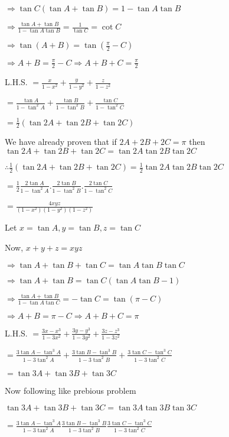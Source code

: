  $\Rightarrow \tan C(\tan A + \tan B) = 1 - \tan A\tan B$

  $\Rightarrow \frac{\tan A + \tan B}{1 - \tan A\tan B} = \frac{1}{\tan C} = \cot C$

  $\Rightarrow \tan(A + B) = \tan\left(\frac{\pi}{2} - C\right)$

  $\Rightarrow A + B = \frac{\pi}{2} - C \Rightarrow A + B + C = \frac{\pi}{2}$

  L.H.S. $= \frac{x}{1 - x^2} + \frac{y}{1 - y^2} + \frac{z}{1 - z^2}$

  $= \frac{\tan A}{1 - \tan^2A} + \frac{\tan B}{1 - \tan^2B} + \frac{\tan C}{1 - \tan^2C}$

  $= \frac{1}{2}(\tan 2A + \tan 2B + \tan 2C)$

  We have already proven that if $2A + 2B + 2C = \pi$ then $\tan2A + \tan2B + \tan2C = \tan2A\tan2B\tan2C$

  $\therefore \frac{1}{2}(\tan 2A + \tan 2B + \tan 2C) = \frac{1}{2}\tan2A\tan2B\tan2C$

  $= \frac{1}{2}\frac{2\tan A}{1 - \tan^2A}.\frac{2\tan B}{1 - \tan^2B}.\frac{2\tan C}{1 - \tan^2C}$

  $= \frac{4xyz}{(1 - x^2)(1 - y^2)(1 - z^2)}$

\item Let $x = \tan A, y = \tan B, z = \tan C$

  Now, $x + y + z = xyz$

  $\Rightarrow \tan A + \tan B + \tan C = \tan A\tan B\tan C$

  $\Rightarrow \tan A + \tan B = \tan C(\tan A\tan B - 1)$

  $\Rightarrow \frac{\tan A + \tan B}{1 - \tan A\tan C} = -\tan C = \tan(\pi - C)$

  $\Rightarrow A + B = \pi - C \Rightarrow A + B + C = \pi$

  L.H.S. $= \frac{3x - x^3}{1 - 3x^2} + \frac{3y - y^3}{1 - 3y^2} + \frac{3z - z^3}{1 - 3z^2}$

  $= \frac{3\tan A - \tan^3A}{1 - 3\tan^2A} + \frac{3\tan B - \tan^3B}{1 - 3\tan^2B} + \frac{3\tan C - \tan^3C}{1 -
    3\tan^2C}$

  $= \tan 3A + \tan 3B + \tan 3C$

  Now following like prebious problem

  $\tan3A + \tan3B + \tan3C = \tan3A\tan3B\tan3C$

  $= \frac{3\tan A - \tan^3A}{1 - 3\tan^2A}\frac{3\tan B - \tan^3B}{1 - 3\tan^2B}\frac{3\tan C - \tan^3C}{1 -
    3\tan^2C}$

